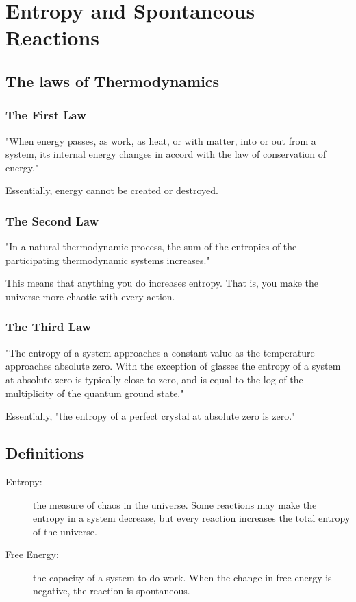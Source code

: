 \documentclass[]{article}
\begin{document}
\section{Entropy and Spontaneous Reactions}
\subsection{The laws of Thermodynamics}
\subsubsection{The First Law}
"When energy passes, as work, as heat, or with matter, into or out from a system, its internal energy changes in accord with the law of conservation of energy."

Essentially, energy cannot be created or destroyed. 
\subsubsection{The Second Law}
"In a natural thermodynamic process, the sum of the entropies of the participating thermodynamic systems increases."

This means that anything you do increases entropy.
That is, you make the universe more chaotic with every action.
\subsubsection{The Third Law}
"The entropy of a system approaches a constant value as the temperature approaches absolute zero. With the exception of glasses the entropy of a system at absolute zero is typically close to zero, and is equal to the log of the multiplicity of the quantum ground state."

Essentially, "the entropy of a perfect crystal at absolute zero is zero." 
\subsection{Definitions}
\begin{description}
\item[Entropy:] the measure of chaos in the universe. Some reactions may make the entropy in a system decrease, but every reaction increases the total entropy of the universe. 
\item[Free Energy:] the capacity of a system to do work. When the change in free energy is negative, the reaction is spontaneous. 
\end{description}
\end{document}
